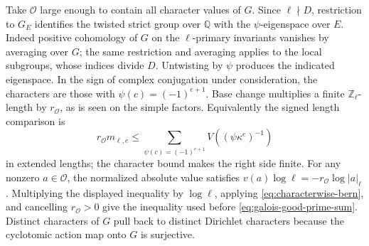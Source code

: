 Take \(\mathcal O\) large enough to contain all character values
of \(G\). Since \(\ell\nmid D\), restriction to \(G_E\) identifies
the twisted strict group over \(\mathbb Q\) with the
\(\psi\)-eigenspace over \(E\). Indeed positive cohomology of \(G\)
on the \(\ell\)-primary invariants vanishes by averaging over \(G\);
the same restriction and averaging applies to the local subgroups,
whose indices divide \(D\). Untwisting by \(\psi\) produces the
indicated eigenspace. In the sign of complex conjugation under
consideration, the characters are those with
\(\psi(c)=(-1)^{e+1}\). Base change multiplies a finite
\(\mathbb Z_\ell\)-length by \(r_{\mathcal O}\), as is seen on the
simple factors. Equivalently the signed length comparison is
\[
 r_{\mathcal O}m_{\ell,e}
       \le\sum_{\psi(c)=(-1)^{e+1}} V((\psi\kappa^e)^{-1})
\]
in extended lengths; the character bound makes the right side finite.
For any nonzero \(a\in\mathcal O\), the normalized absolute value
satisfies \(v(a)\log\ell=-r_{\mathcal O}\log|a|_\ell\).
Multiplying the displayed inequality by \(\log\ell\), applying
\eqref{eq:characterwise-bern}, and cancelling \(r_{\mathcal O}>0\)
give the inequality used before
\eqref{eq:galois-good-prime-sum}. Distinct characters of \(G\) pull
back to distinct Dirichlet characters because the cyclotomic action
map onto \(G\) is surjective.

